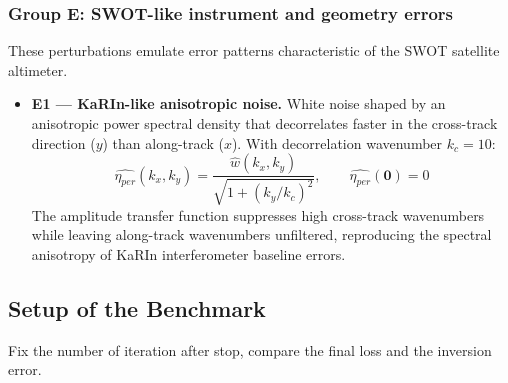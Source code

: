 \documentclass[../SQG_notes.tex]{subfiles}
\begin{document}
    \subsubsection{Group E: SWOT-like instrument and geometry errors}
    These perturbations emulate error patterns characteristic of the SWOT satellite altimeter.
    \begin{itemize}
        \item \textbf{E1 --- KaRIn-like anisotropic noise.} White noise shaped by an anisotropic power spectral density that decorrelates faster in the cross-track direction ($y$) than along-track ($x$). With decorrelation wavenumber $k_c = 10$:
        \[ \hat{\eta_{per}}(k_x, k_y) = \frac{\hat{w}(k_x, k_y)}{\sqrt{1 + (k_y / k_c)^2}}, \qquad \hat{\eta_{per}}(\mathbf{0}) = 0 \]
        The amplitude transfer function suppresses high cross-track wavenumbers while leaving along-track wavenumbers unfiltered, reproducing the spectral anisotropy of KaRIn interferometer baseline errors.

    \end{itemize}

    \subsection{Setup of the Benchmark}
    Fix the number of iteration after stop, compare the final loss and the inversion error. 
\end{document}
